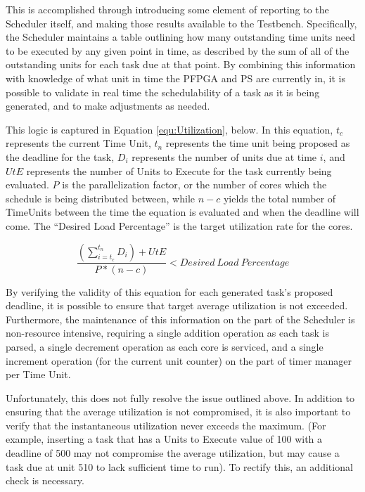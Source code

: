 This is accomplished through introducing some element of reporting to the Scheduler itself, and making those results available to the Testbench. Specifically, the Scheduler maintains a table outlining how many outstanding time units need to be executed by any given point in time, as described by the sum of all of the outstanding units for each task due at that point. By combining this information with knowledge of what unit in time the PFPGA and PS are currently in, it is possible to validate in real time the schedulability of a task as it is being generated, and to make adjustments as needed. 

This logic is captured in Equation \ref{equ:Utilization}, below. In this equation, $t_c$ represents the current Time Unit, $t_n$ represents the time unit being proposed as the deadline for the task, $D_i$ represents the number of units due at time $i$, and $UtE$ represents the number of Units to Execute for the task currently being evaluated. $P$ is the parallelization factor, or the number of cores which the schedule is being distributed between, while $n-c$ yields the total number of TimeUnits between the time the equation is evaluated and when the deadline will come. The ``Desired Load Percentage'' is the target utilization rate for the cores.

\begin{equation}\label{equ:Utilization}
    \frac{(\sum_{i=t_c}^{t_n}D_i)+UtE}{P*(n-c)} < Desired\:Load\:Percentage
\end{equation}

By verifying the validity of this equation for each generated task's proposed deadline, it is possible to ensure that target average utilization is not exceeded. Furthermore, the maintenance of this information on the part of the Scheduler is non-resource intensive, requiring a single addition operation as each task is parsed, a single decrement operation as each core is serviced, and a single increment operation (for the current unit counter) on the part of timer manager per Time Unit.

Unfortunately, this does not fully resolve the issue outlined above. In addition to ensuring that the average utilization is not compromised, it is also important to verify that the instantaneous utilization never exceeds the maximum. (For example, inserting a task that has a Units to Execute value of 100 with a deadline of 500 may not compromise the average utilization, but may cause a task due at unit 510 to lack sufficient time to run). To rectify this, an additional check is necessary. 

